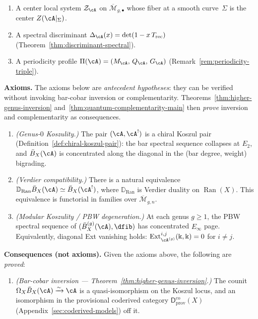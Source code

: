 \begin{definition}
\begin{enumerate}[label=\textup{(D\arabic*)}]
\item\label{D:center-dg}
A center local system $\mathcal{Z}_{\cA}$ on
$\overline{\mathcal{M}}_{g,\bullet}$ whose fiber at a smooth
curve~$\Sigma$ is the center $Z(\cA|_\Sigma)$.

\item\label{D:discriminant-dg}
A spectral discriminant
$\Delta_{\cA}(x) = \det(1 - x\, T_{\mathrm{rec}})$
(Theorem~\ref{thm:discriminant-spectral}).

\item\label{D:periodicity-dg}
A periodicity profile
$\Pi(\cA) = (M_{\cA},\, Q_{\cA},\, G_{\cA})$
(Remark~\ref{rem:periodicity-triple}).
\end{enumerate}

\smallskip\noindent\textbf{Axioms.}
The axioms below are \emph{antecedent hypotheses}:
they can be verified without invoking bar-cobar inversion
or complementarity.  Theorems~\ref{thm:higher-genus-inversion}
and~\ref{thm:quantum-complementarity-main} then \emph{prove}
inversion and complementarity as consequences.
\begin{enumerate}[label=\textup{(MK\arabic*)}]
\item\label{MK:koszul}
\emph{(Genus-$0$ Koszulity.)}
The pair $(\cA, \cA^!)$ is a chiral Koszul pair
(Definition~\ref{def:chiral-koszul-pair}): the bar spectral
sequence collapses at $E_2$, and $\bar{B}_X(\cA)$ is concentrated
along the diagonal in the (bar degree, weight) bigrading.

\item\label{MK:verdier}
\emph{(Verdier compatibility.)}
There is a natural equivalence
$\mathbb{D}_{\operatorname{Ran}} \bar{B}_X(\cA) \simeq \bar{B}_X(\cA^!)$,
where $\mathbb{D}_{\operatorname{Ran}}$ is Verdier duality on
$\operatorname{Ran}(X)$.
This equivalence is functorial in families over
$\overline{\mathcal{M}}_{g,n}$.

\item\label{MK:modular}
\emph{(Modular Koszulity / PBW degeneration.)}
At each genus $g \geq 1$, the PBW spectral sequence of
$(\bar{B}^{(g)}_X(\cA), \dfib)$ has concentrated $E_\infty$ page.
Equivalently, diagonal Ext vanishing holds:
$\operatorname{Ext}^{i,j}_{\cA^{(g)}}(\Bbbk, \Bbbk) = 0$ for $i \neq j$.
\end{enumerate}

\smallskip\noindent\textbf{Consequences (not axioms).}
Given the axioms above, the following are \emph{proved}:
\begin{enumerate}[label=\textup{(MK\arabic*)},start=4]
\item\label{MK:inversion}
\emph{(Bar-cobar inversion --- Theorem~\textup{\ref{thm:higher-genus-inversion}}.)}
The counit $\Omega_X \bar{B}_X(\cA) \xrightarrow{\sim} \cA$ is a
quasi-isomorphism on the Koszul locus, and an isomorphism in the
provisional coderived category
$\mathsf{D}^{\mathrm{co}}_{\mathrm{prov}}(X)$
\textup{(}Appendix~\textup{\ref{sec:coderived-models})} off it.


\end{enumerate}
\end{definition}
